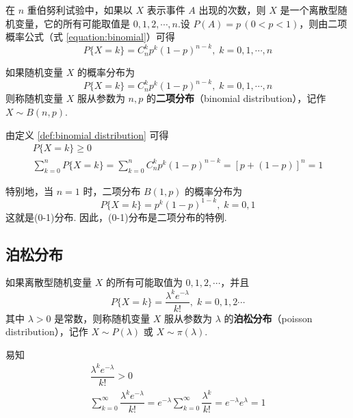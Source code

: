 在 $n$ 重伯努利试验中，如果以 $X$ 表示事件 $A$ 出现的次数，则 $X$ 是一个离散型随机变量，它的所有可能取值是 $0,1,2,\cdots,n$.设 $P(A)=p\,(0<p<1)$，则由二项概率公式（式 \eqref{equation:binomial}）可得
$$
P\{X=k\}=C_n^k p^k (1-p)^{n-k}, \; k=0,1,\cdots,n
$$

\begin{definition} \label{def:binomial distribution}
    如果随机变量 $X$ 的概率分布为
    $$
    P\{X=k\}=C_n^k p^k (1-p)^{n-k}, \; k=0,1,\cdots,n
    $$
    则称随机变量 $X$ 服从参数为 $n,p$ 的\textbf{二项分布}（binomial distribution），记作 $X \sim B(n,p)$.
\end{definition}

由定义 \ref{def:binomial distribution} 可得
\begin{gather*}
    P\{X=k\} \geqslant 0\\
    \sum_{k=0}^n P\{X=k\} = \sum_{k=0}^n C_n^k p^k (1-p)^{n-k} = [p+(1-p)]^n=1
\end{gather*}

特别地，当 $n=1$ 时，二项分布 $B(1,p)$ 的概率分布为
$$
P\{X=k\} = p^k (1-p)^{1-k}, \; k=0,1
$$
这就是(0-1)分布. 因此，(0-1)分布是二项分布的特例.

\subsection{泊松分布}

\begin{definition}
    如果离散型随机变量 $X$ 的所有可能取值为 $0,1,2,\cdots$，并且
    $$
    P\{X=k\} = \dfrac{\lambda^k e^{-\lambda}}{k!}, \; k=0,1,2\cdots
    $$
    其中 $\lambda > 0$ 是常数，则称随机变量 $X$ 服从参数为 $\lambda$ 的\textbf{泊松分布}（poisson distribution），记作 $X \sim P(\lambda)$ 或 $X \sim \pi(\lambda)$.
\end{definition}

易知
\begin{gather*}
    \dfrac{\lambda^k e^{-\lambda}}{k!} > 0\\
    \sum_{k=0}^\infty \dfrac{\lambda^k e^{-\lambda}}{k!} = e^{-\lambda} \sum_{k=0}^\infty \dfrac{\lambda^k}{k!} = e^{-\lambda} e^{\lambda}=1
\end{gather*}

